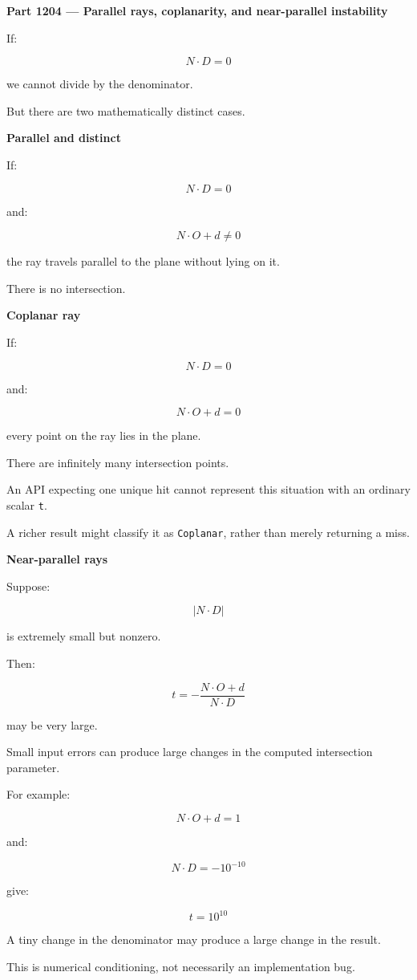 \textbf{Part 1204 --- Parallel rays, coplanarity, and near-parallel instability}

If:

\[
N\cdot D=0
\]

we cannot divide by the denominator.

But there are two mathematically distinct cases.

\textbf{Parallel and distinct}

If:

\[
N\cdot D=0
\]

and:

\[
N\cdot O+d\ne0
\]

the ray travels parallel to the plane without lying on it.

There is no intersection.

\textbf{Coplanar ray}

If:

\[
N\cdot D=0
\]

and:

\[
N\cdot O+d=0
\]

every point on the ray lies in the plane.

There are infinitely many intersection points.

An API expecting one unique hit cannot represent this situation with an ordinary scalar \texttt{t}.

A richer result might classify it as \texttt{Coplanar}, rather than merely returning a miss.

\textbf{Near-parallel rays}

Suppose:

\[
|N\cdot D|
\]

is extremely small but nonzero.

Then:

\[
t=-\frac{N\cdot O+d}{N\cdot D}
\]

may be very large.

Small input errors can produce large changes in the computed intersection parameter.

For example:

\[
N\cdot O+d=1
\]

and:

\[
N\cdot D=-10^{-10}
\]

give:

\[
t=10^{10}
\]

A tiny change in the denominator may produce a large change in the result.

This is numerical conditioning, not necessarily an implementation bug.

